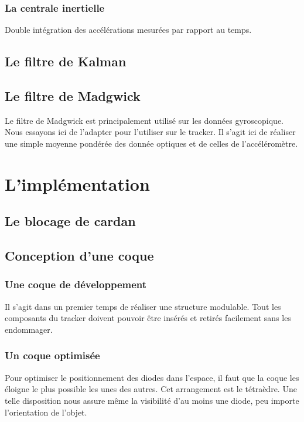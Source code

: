 \documentclass[10pt]{report}
\begin{document}
\subsection{La centrale inertielle}

Double intégration des accélérations mesurées par rapport au temps.

\section{Le filtre de Kalman}

\section{Le filtre de Madgwick}

Le filtre de Madgwick est principalement utilisé sur les données gyroscopique. Nous essayons ici de l'adapter pour l'utiliser sur le tracker. Il s'agit ici de réaliser une simple moyenne pondérée des donnée optiques et de celles de l'accéléromètre.

\chapter{L'implémentation}

\section{Le blocage de cardan}

\section{Conception d'une coque}

\subsection{Une coque de développement}

Il s'agit dans un premier temps de réaliser une structure modulable. Tout les composants du tracker doivent pouvoir être insérés et retirés facilement sans les endommager.

\subsection{Un coque optimisée}

Pour optimiser le positionnement des diodes dans l'espace, il faut que la coque les éloigne le plus possible les unes des autres. Cet arrangement est le tétraèdre. Une telle disposition nous assure même la visibilité d'au moins une diode, peu importe l'orientation de l'objet.
\end{document}
